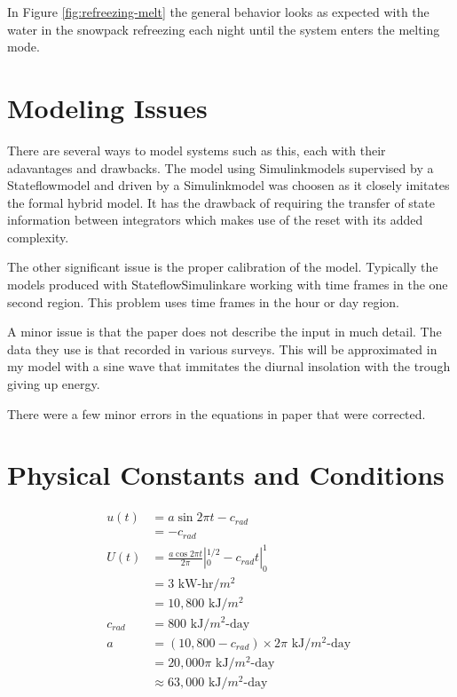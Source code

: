 \documentclass{article}
\begin{document}
In Figure \ref{fig:refreezing-melt} the general behavior looks as expected
with the water in the snowpack refreezing each night until
the system enters the melting mode.


\section{Modeling Issues}

There are several ways to model systems such as this,
each with their adavantages and drawbacks.
The model using Simulink\textregistered models supervised
by a Stateflow\textregistered model and driven by a
Simulink\textregistered model was choosen as it
closely imitates the formal hybrid model.
It has the drawback of requiring the transfer of
state information between integrators which makes use
of the reset with its added complexity.

The other significant issue is the proper calibration of the model.
Typically the models produced with
Stateflow\textregistered Simulink\textregistered are working
with time frames in the one second region.
This problem uses time frames in the hour or day region.

A minor issue is that the paper does not describe
the input in much detail.
The data they use is that recorded in various surveys.
This will be approximated in my model with a sine wave
that immitates the diurnal insolation with the trough
giving up energy.

There were a few minor errors in the equations in
paper that were corrected.


\section{Physical Constants and Conditions}

\begin{align}
u(t) &= a \sin{2 \pi t} - c_{rad} \\
 &= - c_{rad} \\
U(t) &= \frac{a \cos{2 \pi t}}{2 \pi} |_0^{1/2} - c_{rad} t |_0^1 \\
  &= 3 \text{ kW-hr/$m^2$ } \\
  &= 10,800 \text{ kJ/$m^2$ } \\
c_{rad} &= 800 \text{ kJ/$m^2$-day } \\
a &= (10,800 - c_{rad}) \times 2 \pi \text{ kJ/$m^2$-day } \\
 &= 20,000 \pi \text{ kJ/$m^2$-day } \\
 &\approx 63,000 \text{ kJ/$m^2$-day }
\end{align}
\end{document}
